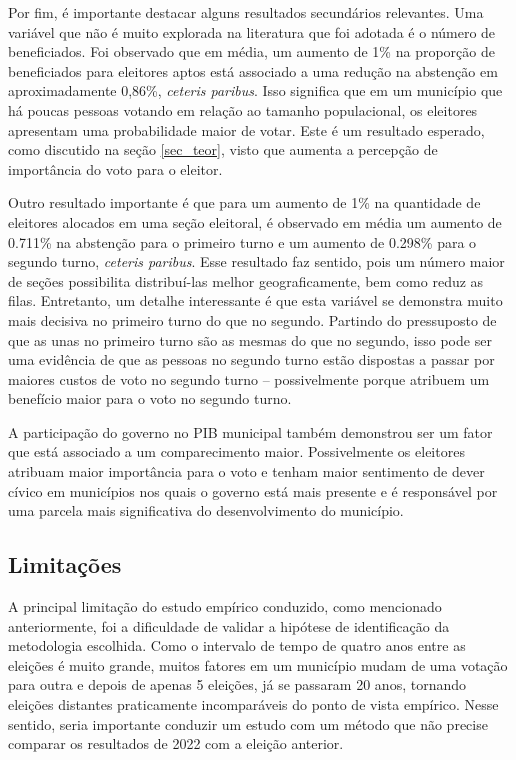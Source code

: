 Por fim, é importante destacar alguns resultados secundários relevantes. Uma variável que não é muito explorada na literatura que foi adotada é o número de beneficiados. Foi observado que em média, um aumento de 1\% na proporção de beneficiados para eleitores aptos está associado a uma redução na abstenção em aproximadamente 0,86\%, \textit{ceteris paribus}. Isso significa que em um município que há poucas pessoas votando em relação ao tamanho populacional, os eleitores apresentam uma probabilidade maior de votar. Este é um resultado esperado, como discutido na seção \ref{sec_teor}, visto que aumenta a percepção de importância do voto para o eleitor.

Outro resultado importante é que para um aumento de 1\% na quantidade de eleitores alocados em uma seção eleitoral, é observado em média um aumento de 0.711\% na abstenção para o primeiro turno e um aumento de 0.298\% para o segundo turno, \textit{ceteris paribus}. Esse resultado faz sentido, pois um número maior de seções possibilita distribuí-las melhor geograficamente, bem como reduz as filas. Entretanto, um detalhe interessante é que esta variável se demonstra muito mais decisiva no primeiro turno do que no segundo. Partindo do pressuposto de que as unas no primeiro turno são as mesmas do que no segundo, isso pode ser uma evidência de que as pessoas no segundo turno estão dispostas a passar por maiores custos de voto no segundo turno -- possivelmente porque atribuem um benefício maior para o voto no segundo turno.

A participação do governo no PIB municipal também demonstrou ser um fator que está associado a um comparecimento maior. Possivelmente os eleitores atribuam maior importância para o voto e tenham maior sentimento de dever cívico em municípios nos quais o governo está mais presente e é responsável por uma parcela mais significativa do desenvolvimento do município.

\subsection{Limitações}

A principal limitação do estudo empírico conduzido, como mencionado anteriormente, foi a dificuldade de validar a hipótese de identificação da metodologia escolhida. Como o intervalo de tempo de quatro anos entre as eleições é muito grande, muitos fatores em um município mudam de uma votação para outra e depois de apenas 5 eleições, já se passaram 20 anos, tornando eleições distantes praticamente incomparáveis do ponto de vista empírico. Nesse sentido, seria importante conduzir um estudo com um método que não precise comparar os resultados de 2022 com a eleição anterior.

